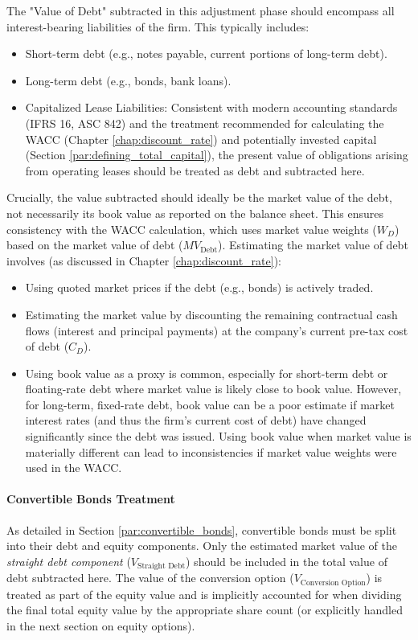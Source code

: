 The "Value of Debt" subtracted in this adjustment phase should encompass all interest-bearing liabilities of the firm. This typically includes:
\begin{itemize}
    \item Short-term debt (e.g., notes payable, current portions of long-term debt).
    \item Long-term debt (e.g., bonds, bank loans).
    \item Capitalized Lease Liabilities: Consistent with modern accounting standards (IFRS 16, ASC 842) and the treatment recommended for calculating the WACC (Chapter \ref{chap:discount_rate}) and potentially invested capital (Section \ref{par:defining_total_capital}), the present value of obligations arising from operating leases should be treated as debt and subtracted here.
\end{itemize}

Crucially, the value subtracted should ideally be the market value of the debt, not necessarily its book value as reported on the balance sheet. This ensures consistency with the WACC calculation, which uses market value weights (\(W_D\)) based on the market value of debt (\(MV_{\text{Debt}}\)). Estimating the market value of debt involves (as discussed in Chapter \ref{chap:discount_rate}):
\begin{itemize}
    \item Using quoted market prices if the debt (e.g., bonds) is actively traded.
    \item Estimating the market value by discounting the remaining contractual cash flows (interest and principal payments) at the company's current pre-tax cost of debt (\(C_D\)).
    \item Using book value as a proxy is common, especially for short-term debt or floating-rate debt where market value is likely close to book value. However, for long-term, fixed-rate debt, book value can be a poor estimate if market interest rates (and thus the firm's current cost of debt) have changed significantly since the debt was issued. Using book value when market value is materially different can lead to inconsistencies if market value weights were used in the WACC.
\end{itemize}

\paragraph{Convertible Bonds Treatment}
As detailed in Section \ref{par:convertible_bonds}, convertible bonds must be split into their debt and equity components. Only the estimated market value of the \textit{straight debt component} (\(V_{\text{Straight Debt}}\)) should be included in the total value of debt subtracted here. The value of the conversion option (\(V_{\text{Conversion Option}}\)) is treated as part of the equity value and is implicitly accounted for when dividing the final total equity value by the appropriate share count (or explicitly handled in the next section on equity options).

